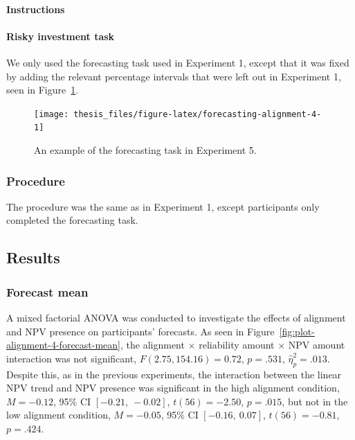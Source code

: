 \documentclass[a4paper, nobind, dvipsnames]{templates/ociamthesis}
\theoremstyle{definition}
\theoremstyle{definition}
\theoremstyle{definition}
\theoremstyle{definition}
\theoremstyle{remark}
\begin{document}
\paragraph{Instructions}

\paragraph{Risky investment task}

We only used the forecasting task used in Experiment 1, except that it was fixed
by adding the relevant percentage intervals that were left out in Experiment 1,
seen in Figure~\ref{fig:forecasting-alignment-4}.



\begin{figure}
\texttt{[image: thesis\_files/figure-latex/forecasting-alignment-4-1]} \caption{An example of the forecasting task in Experiment 5.}\label{fig:forecasting-alignment-4}
\end{figure}

\subsubsection{Procedure}

The procedure was the same as in Experiment 1, except participants only
completed the forecasting task.

\subsection{Results}

\subsubsection{Forecast mean}

A mixed factorial ANOVA was conducted to investigate the effects of alignment
and NPV presence on participants' forecasts. As seen in
Figure~\ref{fig:plot-alignment-4-forecast-mean}, the alignment \(\times\)
reliability amount \(\times\) NPV amount interaction was not significant,
\(F(2.75, 154.16) = 0.72\), \(p = .531\), \(\hat{\eta}^2_p = .013\).
Despite this, as in the previous experiments, the interaction between the linear
NPV trend and NPV presence was significant in the high alignment condition,
\(M = -0.12\), 95\% CI \([-0.21,~-0.02]\), \(t(56) = -2.50\), \(p = .015\), but not in the
low alignment condition,
\(M = -0.05\), 95\% CI \([-0.16,~0.07]\), \(t(56) = -0.81\), \(p = .424\).
\end{document}
